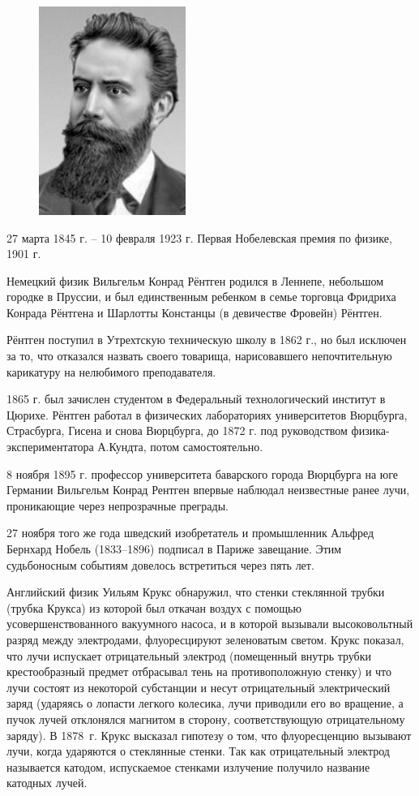 \documentclass[a4paper,14pt, openany, twoside, draft]{extbook} %
\begin{document}
\begin{figure}
\centering
\includegraphics[width=4.794cm,height=6.798cm]{a11-img001.jpg}
\end{figure}
27 марта 1845 г. – 10 февраля 1923 г. Первая Нобелевская премия по физике, 1901 г.

Немецкий физик Вильгельм Конрад Рёнтген родился в Леннепе, небольшом городке в Пруссии, и был единственным ребенком в семье торговца Фридриха Конрада Рёнтгена и Шарлотты Констанцы (в девичестве Фровейн) Рёнтген.

Рёнтген поступил в Утрехтскую техническую школу в 1862 г., но был исключен за то, что отказался назвать своего товарища, нарисовавшего непочтительную карикатуру на нелюбимого преподавателя.

1865 г. был зачислен студентом в Федеральный технологический институт в Цюрихе. Рёнтген работал в физических лабораториях университетов Вюрцбурга, Страсбурга, Гисена и снова Вюрцбурга, до 1872 г. под руководством физика-экспериментатора А.Кундта, потом самостоятельно.

8 ноября 1895 г. профессор университета баварского города Вюрцбурга на юге Германии Вильгельм Конрад Рентген впервые наблюдал неизвестные ранее лучи, проникающие через непрозрачные преграды.

27 ноября того же года шведский изобретатель и промышленник Альфред Бернхард Нобель (1833–1896) подписал в Париже завещание. Этим судьбоносным событиям довелось встретиться через пять лет.

Английский физик Уильям Крукс обнаружил, что стенки стеклянной трубки (трубка Крукса) из которой был откачан воздух с помощью усовершенствованного вакуумного насоса, и в которой вызывали высоковольтный разряд между электродами, флуоресцируют зеленоватым светом. Крукс показал, что лучи испускает отрицательный электрод (помещенный внутрь трубки крестообразный предмет отбрасывал тень на противоположную стенку) и что лучи состоят из некоторой субстанции и несут отрицательный электрический заряд (ударяясь о лопасти легкого колесика, лучи приводили его во вращение, а пучок лучей отклонялся магнитом в сторону, соответствующую отрицательному заряду). В 1878~г. Крукс высказал гипотезу о том, что флуоресценцию вызывают лучи, когда ударяются о стеклянные стенки. Так как отрицательный электрод называется катодом, испускаемое стенками излучение получило название катодных лучей.
\end{document}
